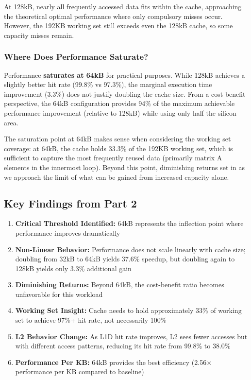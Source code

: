 \documentclass[11pt,a4paper]{article}
\begin{document}
At 128kB, nearly all frequently accessed data fits within the cache, approaching the theoretical optimal performance where only compulsory misses occur. However, the 192KB working set still exceeds even the 128kB cache, so some capacity misses remain.

\subsubsection{Where Does Performance Saturate?}

Performance \textbf{saturates at 64kB} for practical purposes. While 128kB achieves a slightly better hit rate (99.8\% vs 97.3\%), the marginal execution time improvement (3.3\%) does not justify doubling the cache size. From a cost-benefit perspective, the 64kB configuration provides 94\% of the maximum achievable performance improvement (relative to 128kB) while using only half the silicon area.

The saturation point at 64kB makes sense when considering the working set coverage: at 64kB, the cache holds 33.3\% of the 192KB working set, which is sufficient to capture the most frequently reused data (primarily matrix A elements in the innermost loop). Beyond this point, diminishing returns set in as we approach the limit of what can be gained from increased capacity alone.

\subsection{Key Findings from Part 2}

\begin{enumerate}[noitemsep]
    \item \textbf{Critical Threshold Identified:} 64kB represents the inflection point where performance improves dramatically

    \item \textbf{Non-Linear Behavior:} Performance does not scale linearly with cache size; doubling from 32kB to 64kB yields 37.6\% speedup, but doubling again to 128kB yields only 3.3\% additional gain

    \item \textbf{Diminishing Returns:} Beyond 64kB, the cost-benefit ratio becomes unfavorable for this workload

    \item \textbf{Working Set Insight:} Cache needs to hold approximately 33\% of working set to achieve 97\%+ hit rate, not necessarily 100\%

    \item \textbf{L2 Behavior Change:} As L1D hit rate improves, L2 sees fewer accesses but with different access patterns, reducing its hit rate from 99.8\% to 38.0\%

    \item \textbf{Performance Per KB:} 64kB provides the best efficiency (2.56× performance per KB compared to baseline)
\end{enumerate}
\end{document}
